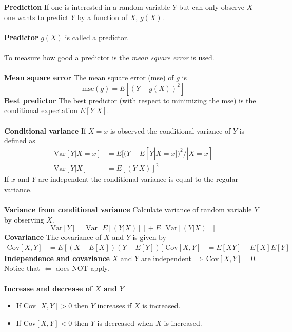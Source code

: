 \documentclass[12pt,a4paper,draft]{report}
\author{Frederik Appel Vardinghus-Nielsen}
\begin{document}
\noindent\textbf{Prediction} If one is interested in a random variable $Y$ but can only observe $X$ one wants to predict $Y$ by a function of $X$, $g(X)$.\\\\
\textbf{Predictor} $g(X)$ is called a predictor.\\\\
To measure how good a predictor is the \textit{mean square error} is used.\\\\
\textbf{Mean square error} The mean square error (mse) of $g$ is
\begin{equation}
\mathrm{mse}(g)=E[(Y-g(X))^2]
\end{equation}
\textbf{Best predictor} The best predictor (with respect to minimizing the mse) is the conditional expectation $E[Y|X]$.\\\\
\textbf{Conditional variance} If $X=x$ is observed the conditional variance of $Y$ is defined as
\begin{align*}
\text{Var}[Y|X=x]&=E[(Y-E[Y|X=x])^2/|X=x]\\
\text{Var}[Y|X]&=E[(Y|X)]^2
\end{align*}
If $x$ and $Y$ are independent the conditional variance is equal to the regular variance.\\\\
\textbf{Variance from conditional variance} Calculate variance of random variable $Y$ by observing $X$.
\begin{equation}
\text{Var}[Y]=\text{Var}[E[(Y|X)]]+E[\text{Var}[(Y|X)]]
\end{equation}
\textbf{Covariance} The covariance of $X$ and $Y$ is given by
\begin{align*}
\text{Cov}[X,Y]&=E[(X-E[X])(Y-E[Y])]
\text{Cov}[X,Y]&=E[XY]-E[X]E[Y]
\end{align*}
\textbf{Independence and covariance} $X$ and $Y$ are independent $\Rightarrow\,\text{Cov}[X,Y]=0$.\\
Notice that $\Leftarrow$ does NOT apply.\\\\
\textbf{Increase and decrease of $X$ and $Y$}
\begin{itemize}
\setlength\itemsep{0em}
\item If Cov$[X,Y]>0$ then $Y$ increases if $X$ is increased.
\item If Cov$[X,Y]<0$ then $Y$ is decreased when $X$ is increased.
\end{itemize}
\end{document}
